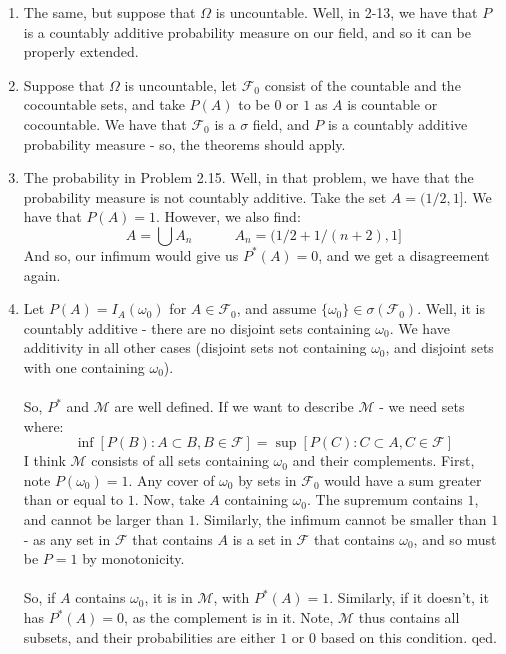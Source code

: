 \documentclass[12pt,a4paper]{article}
\newcommand{\1}[1]{\mathbbm{1}\left\{ #1 \right\}}
\newcommand{\fcal}{\mathcal{F}}
\newcommand{\mcal}{\mathcal{M}}
\begin{document}
\begin{enumerate}
	\item The same, but suppose that $\Omega$ is uncountable. Well, in 2-13, we have that $P$ is a countably additive probability measure on our field, and so it can be properly extended.
	
	\item Suppose that $\Omega$ is uncountable, let $\fcal_0$ consist of the countable and the cocountable sets, and take $P(A)$ to be $0$ or $1$ as $A$ is countable or cocountable. We have that $\fcal_0$ is a $\sigma$ field, and $P$ is a countably additive probability measure - so, the theorems should apply.
	
	\item The probability in Problem 2.15. Well, in that problem, we have that the probability measure is not countably additive. Take the set $A = (1/2,1]$. We have that $P(A) = 1$. However, we also find:
	$$
		A = \bigcup A_n \quad\quad\quad A_n = (1/2 + 1/(n+2), 1]
	$$
	And so, our infimum would give us $P^*(A) = 0$, and we get a disagreement again.
	
	\item Let $P(A) = I_A(\omega_0)$ for $A \in \fcal_0$, and assume $\{\omega_0\} \in \sigma(\fcal_0)$. Well, it is countably additive - there are no disjoint sets containing $\omega_0$. We have additivity in all other cases (disjoint sets not containing $\omega_0$, and disjoint sets with one containing $\omega_0$).
	\\\\
	So, $P^*$ and $\mcal$ are well defined. If we want to describe $\mcal$ - we need sets where:
	$$
		\inf\left[P(B) : A \subset B, B \in \fcal\right] =
		\sup\left[P(C) : C \subset A, C \in \fcal\right]
	$$
	I think $\mcal$ consists of all sets containing $\omega_0$ and their complements. First, note $P(\omega_0) = 1$. Any cover of $\omega_0$ by sets in $\fcal_0$ would have a sum greater than or equal to $1$. Now, take $A$ containing $\omega_0$. The supremum contains $1$, and cannot be larger than $1$. Similarly, the infimum cannot be smaller than $1$ - as any set in $\fcal$ that contains $A$ is a set in $\fcal$ that contains $\omega_0$, and so must be $P = 1$ by monotonicity.
	\\\\
	So, if $A$ contains $\omega_0$, it is in $\mcal$, with $P^*(A) = 1$. Similarly, if it doesn't, it has $P^*(A) = 0$, as the complement is in it. Note, $\mcal$ thus contains all subsets, and their probabilities are either $1$ or $0$ based on this condition. qed.
	
\end{enumerate}
\end{document}
